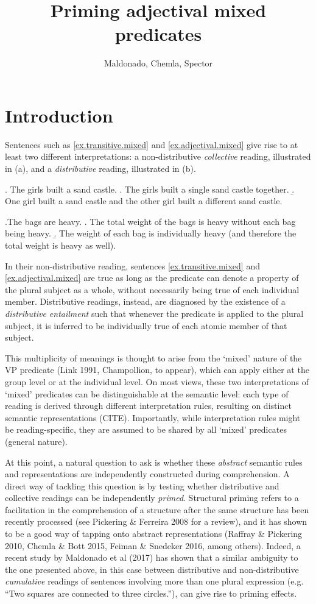 \documentclass[a4paper, 11pt]{article}
\title{Priming adjectival mixed predicates}
\author{Maldonado, Chemla, Spector}
\begin{document}
\maketitle


\section{Introduction}
Sentences such as \ref{ex.transitive.mixed} and \ref{ex.adjectival.mixed} give rise to at least two different interpretations: a non-distributive \emph{collective} reading, illustrated in (a), and a \emph{distributive} reading, illustrated in (b). 

\ex. The girls built a sand castle. \label{ex.transitive.mixed}
\a. The girls built a single sand castle together. 
\b. One girl built a sand castle and the other girl built a different sand castle.  

\ex.The bags are heavy. \label{ex.adjectival.mixed}
\a. The total weight of the bags is heavy without each bag being heavy. 
\b. The weight of each bag is individually heavy (and therefore the total weight is heavy as well).  

In their non-distributive reading, sentences \ref{ex.transitive.mixed} and \ref{ex.adjectival.mixed} are true as long as the predicate can denote a property of the plural subject as a whole, without necessarily being true of each individual member. 
Distributive readings, instead, are diagnosed by the existence of a \emph{distributive entailment} such that whenever the predicate is applied to the plural subject, it is inferred to be individually true of each atomic member of that subject. 

This multiplicity of meanings is thought to arise from the `mixed' nature of the VP predicate  (Link 1991, Champollion, to appear), which can apply either at the group level or at the individual level. On most views, these two interpretations of `mixed' predicates can be distinguishable at the semantic level: each type of reading is derived through different interpretation rules, resulting on distinct semantic representations (CITE). Importantly, while interpretation rules might be reading-specific, they are assumed to be shared by all `mixed' predicates (general nature). 

At this point, a natural question to ask is whether these \emph{abstract} semantic rules and representations are independently constructed during comprehension. A direct way of tackling this question is by testing whether distributive and collective readings can be independently \emph{primed}.  Structural priming refers to a facilitation in the comprehension of a structure after the same structure has been recently processed (see Pickering \& Ferreira 2008 for a review), and it has shown to be a good way of tapping onto abstract representations (Raffray \& Pickering 2010, Chemla \& Bott 2015, Feiman \& Snedeker 2016, among others). 
Indeed, a recent study by Maldonado et al (2017) has shown that a similar ambiguity to the one presented above, in this case between distributive and non-distributive \emph{cumulative} readings of sentences involving more than one plural expression (e.g. ``Two squares are connected to three circles.''), can give rise to priming effects.
\end{document}

